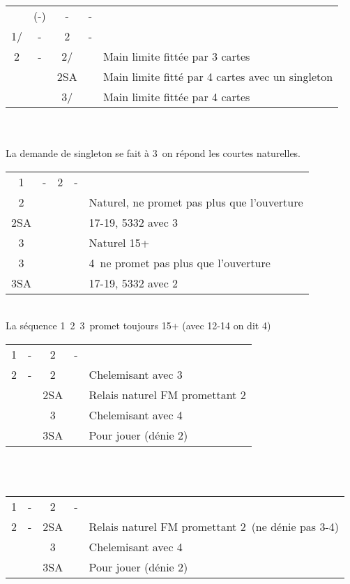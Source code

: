 \documentclass[a4paper, oneside, 11pt]{report}
\begin{document}
		\begin{tabular}{cccc|l}
		& (-) & - & - &\\
		1\coeur/\pique & - & 2\trefle & - &\\
		2\carreau & - & 2\coeur/\pique && Main limite fittée par 3 cartes\\
		&& 2SA && Main limite fitté par 4 cartes avec un singleton\\
		&& 3\coeur/\pique && Main limite fittée par 4 cartes\\
		\end{tabular}\\\\
		
		La demande de singleton se fait à 3\trefle\ on répond les courtes naturelles.\\

\newpage
		\begin{tabular}{cccc|l}
		1\coeur & - & 2\carreau & - &\\
		2\pique &&&& Naturel,  ne promet pas plus que l'ouverture\\
		2SA &&&& 17-19,  5332 avec 3\carreau\\
		3\trefle &&&& Naturel 15+\\
		3\carreau &&&& 4\carreau\, ne promet pas plus que l'ouverture\\
		3SA &&&& 17-19,  5332 avec 2\carreau\\
		\end{tabular}\\
		La séquence 1\pique\ 2\coeur\ 3\coeur\ promet toujours 15+ (avec 12-14 on dit 4\coeur)\\

		\begin{tabular}{cccc|l}
		1\pique & - & 2\carreau & - &\\
		2\coeur & - & 2\pique && Chelemisant avec 3\pique\\
		&& 2SA && Relais naturel FM promettant 2\pique\\
		&& 3\pique && Chelemisant avec 4\pique\\
		&& 3SA && Pour jouer (dénie 2\pique)\\
		\end{tabular}\\\\

		\begin{tabular}{cccc|l}
		1\pique & - & 2\carreau & - &\\
		2\pique & - & 2SA && Relais naturel FM promettant 2\pique\ (ne dénie pas 3-4\pique)\\
		&& 3\pique && Chelemisant avec 4\pique\\
		&& 3SA && Pour jouer (dénie 2\pique)\\
		\end{tabular}\\\\
\end{document}
